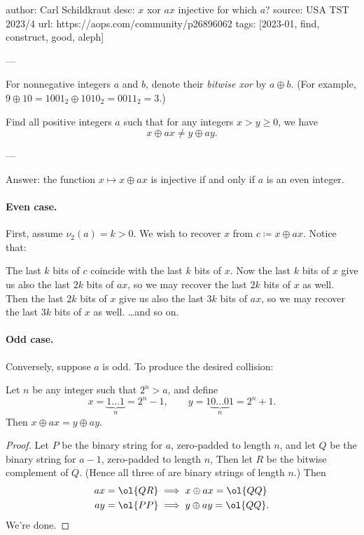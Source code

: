 author: Carl Schildkraut
desc: $x$ xor $ax$ injective for which $a$?
source: USA TST 2023/4
url: https://aops.com/community/p26896062
tags: [2023-01, find, construct, good, aleph]

---

For nonnegative integers $a$ and $b$,
denote their \emph{bitwise xor} by $a \oplus b$.
(For example, $9 \oplus 10 = 1001_2 \oplus 1010_2 = 0011_2 = 3$.)

Find all positive integers $a$ such that
for any integers $x > y \ge 0$, we have
\[ x \oplus ax \neq y \oplus ay.  \]

---

Answer: the function $x \mapsto x \oplus ax$ is injective if and only if
$a$ is an even integer.

\paragraph{Even case.}
First, assume $\nu_2(a) = k > 0$.
We wish to recover $x$ from $c \coloneqq x \oplus ax$.
Notice that:
\begin{itemize}
  \ii The last $k$ bits of $c$ coincide with the last $k$ bits of $x$.
  \ii Now the last $k$ bits of $x$ give us also the last $2k$ bits of $ax$,
  so we may recover the last $2k$ bits of $x$ as well.
  \ii Then the last $2k$ bits of $x$ give us also the last $3k$ bits of $ax$,
  so we may recover the last $3k$ bits of $x$ as well.
  \ii \dots and so on.
\end{itemize}

\paragraph{Odd case.}
Conversely, suppose $a$ is odd.
To produce the desired collision:
\begin{claim*}
  Let $n$ be any integer such that $2^n > a$, and define
  \[ x = \underbrace{1\dots1}_n = 2^n-1,
  \qquad y = 1\underbrace{0\dots0}_n1 = 2^n+1. \]
  Then $x \oplus ax = y \oplus ay$.
\end{claim*}
\begin{proof}
  Let $P$ be the binary string for $a$, zero-padded to length $n$,
  and let $Q$ be the binary string for $a - 1$, zero-padded to length $n$,
  Then let $R$ be the bitwise complement of $Q$.
  (Hence all three of are binary strings of length $n$.)
  Then
  \begin{align*}
    ax = \ol{QR} &\implies x \oplus ax = \ol{QQ} \\
    ay = \ol{PP} &\implies y \oplus ay = \ol{QQ}.
  \end{align*}
  We're done.
\end{proof}
